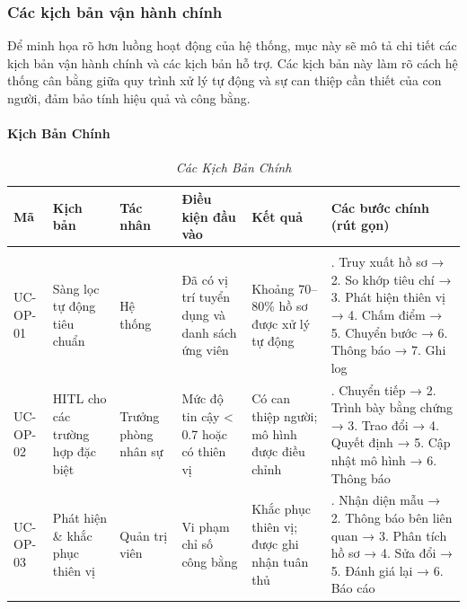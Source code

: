 \documentclass{article}
\begin{document}
\subsubsection{Các kịch bản vận hành chính}
Để minh họa rõ hơn luồng hoạt động của hệ thống, mục này sẽ mô tả chi tiết các kịch bản vận hành chính và các kịch bản hỗ trợ. Các kịch bản này làm rõ cách hệ thống cân bằng giữa quy trình xử lý tự động và sự can thiệp cần thiết của con người, đảm bảo tính hiệu quả và công bằng.

\paragraph{Kịch Bản Chính}

\begin{longtable}{|
  >{\raggedright\arraybackslash}p{}|
  >{\raggedright\arraybackslash}p{}|
  >{\raggedright\arraybackslash}p{}|
  >{\raggedright\arraybackslash}p{}|
  >{\raggedright\arraybackslash}p{}|
  >{\raggedright\arraybackslash}p{}|}

  \hline
  \textbf{Mã} &
  \textbf{Kịch bản} &
  \textbf{Tác nhân} &
  \textbf{Điều kiện đầu vào} &
  \textbf{Kết quả} &
  \textbf{Các bước chính (rút gọn)} \\
  \hline
  \endfirsthead

  \endhead

  \hline
  \endfoot

  \hline
  \caption{\textit{Các Kịch Bản Chính}} \\
  \endlastfoot

  UC-OP-01 &
  Sàng lọc tự động tiêu chuẩn &
  Hệ thống &
  Đã có vị trí tuyển dụng và danh sách ứng viên &
  Khoảng 70–80\% hồ sơ được xử lý tự động &
  1. Truy xuất hồ sơ → 2. So khớp tiêu chí → 3. Phát hiện thiên vị → 4. Chấm điểm → 5. Chuyển bước → 6. Thông báo → 7. Ghi log \\
  \hline

  UC-OP-02 &
  HITL cho các trường hợp đặc biệt &
  Trưởng phòng nhân sự &
  Mức độ tin cậy < 0.7 hoặc có thiên vị &
  Có can thiệp người; mô hình được điều chỉnh &
  1. Chuyển tiếp → 2. Trình bày bằng chứng → 3. Trao đổi → 4. Quyết định → 5. Cập nhật mô hình → 6. Thông báo \\
  \hline

  UC-OP-03 &
  Phát hiện \& khắc phục thiên vị &
  Quản trị viên &
  Vi phạm chỉ số công bằng &
  Khắc phục thiên vị; được ghi nhận tuân thủ &
  1. Nhận diện mẫu → 2. Thông báo bên liên quan → 3. Phân tích hồ sơ → 4. Sửa đổi → 5. Đánh giá lại → 6. Báo cáo \\
\end{longtable}
\end{document}

